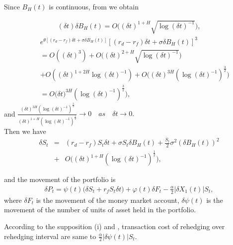 \documentclass[a4paper,11pt]{amsart}
\numberwithin{equation}{section}
\theoremstyle{definition}
\theoremstyle{plain}
\theoremstyle{definition}
\newcommand{\1}{\mathbf{1}}
\begin{document}
Since $B_H(t)$ is continuous, from \cite{chen} we obtain

\begin{eqnarray}
(\delta t)\delta B_H(t)=O\Big((\delta t)^{1+H}\sqrt{\log (\delta t)^{-1}}\Big),
\label{eq:29}
\end{eqnarray}
\begin{eqnarray}
&&e^{\theta[(r_d-r_f)\delta t+\sigma\delta B_H(t)]}[(r_d-r_f)\delta t+\sigma\delta B_H(t)]^3\nonumber\\
&&=O((\delta t)^3)+O\Big((\delta t)^{2+H}\sqrt{\log (\delta t)^{-1}}\Big)\nonumber \\
&&+O((\delta t)^{1+2H}\log(\delta t)^{-1})+O\Big((\delta t)^{3H}(\log (\delta t)^{-1})^{\frac{3}{2}}\Big)\nonumber\\
&&=O\Big(\delta t)^{3H}(\log (\delta t)^{-1})^{\frac{3}{2}}\Big),
\label{eq:30}
\end{eqnarray}
and  $\frac{(\delta t)^{3H}(\log (\delta t)^{-1})^{\frac{3}{2}}}{(\delta t)^{1+H}(\log (\delta t)^{-1})^{\frac{1}{2}}}\rightarrow 0\quad as \quad \delta t\rightarrow 0.$\\

Then we have
\begin{eqnarray}
\delta S_t&=&(r_d-r_f)S_t\delta t+\sigma S_t\delta B_H(t)+\frac{S_t}{2}\sigma ^2(\delta B_H(t))^2\nonumber\\
&+&O\Big((\delta t)^{1+H}(\log (\delta t)^{-1})^{\frac{1}{2}}\Big),
\label{eq:31}
\end{eqnarray}

and the movement of the portfolio is
\begin{eqnarray}
\delta P_t=\psi(t)\Big(\delta S_t+r_fS_t\delta t\Big)+\varphi(t)\delta F_t-\frac{\alpha}{2}|\delta X_1(t)|S_t,
\label{eq:32}
\end{eqnarray}
where $\delta F_t$ is the movement of the money market account, $\delta \psi(t)$ is the movement of the number of units of  asset held in the portfolio.

According to the supposition (i) and \cite{leland}, transaction cost of rehedging over rehedging interval are same to $\frac{\alpha}{2}|\delta \psi(t)|S_t$.
\end{document}
